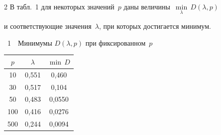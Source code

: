 \begin{multicols}{2}
В табл.~1 для некоторых значений~$p$ даны величины~$\underset{\lambda}{\min}\, D(\lambda,p)$ 

и соответствующие значения~$\lambda$, при которых достигается минимум.



\bigskip



\begin{center} %

\noindent

\parbox{59mm}{{\tablename~1}\ \ \small{Минимумы $D(\lambda,p)$ при фиксированном~$p$}}

\end{center}




{\small

\begin{center}

\tabcolsep=16pt

\begin{tabular}{|c|c|c|}

\hline

$p$ & $\lambda$ &$\min\, D$\\

\hline

 10 & 0,551 & 0,460\hphantom{9}\\

 30  &  0,517 & 0,104\hphantom{9}\\

 50  &  0,483 & 0,0550\\

 100\hphantom{9} & 0,416 & 0,0276\\

 500\hphantom{9}  & 0,244 & 0,0094\\

\hline

\end{tabular}

\end{center}

}







\addtocounter{table}{1}






\end{multicols}
